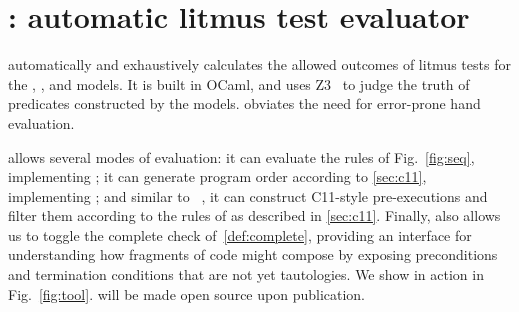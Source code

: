 \section{\PwTerTITLE: automatic litmus test evaluator}
\label{sec:tool}

\PwTer{} automatically and exhaustively calculates the allowed outcomes of litmus tests for the \PwT, \PwTpo, and \PwTc{} models. It is built in OCaml, and uses Z3~\cite{Z3Solver} to judge the truth of predicates constructed by the models. \PwTer{} obviates the need for error-prone hand evaluation.

\PwTer{} allows several modes of evaluation: it can evaluate the rules of Fig.~\ref{fig:seq}, implementing \PwT; it can generate program order according to \textsection\ref{sec:c11}, implementing \PwTpo; and similar to \MRD~\cite{DBLP:conf/esop/PaviottiCPWOB20}, it can construct C11-style pre-executions and filter them according to the rules of \rcXI{} as described in \textsection\ref{sec:c11}.
Finally, \PwTer{} also allows us to toggle the complete check of~\ref{def:complete}, providing an interface for understanding how fragments of code might compose by exposing preconditions and termination conditions that are not yet tautologies.
We show \PwTer{} in action in Fig.~\ref{fig:tool}. 
\PwTer{} will be made open source upon publication.







